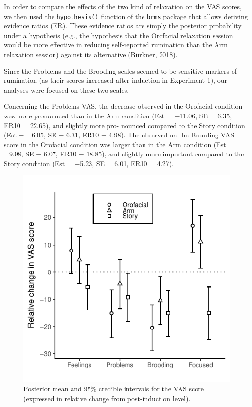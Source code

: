 \documentclass[a4paper,12pt,twoside,openright,oldfontcommands,final]{memoir}
\begin{document}
In order to compare the effects of the two kind of relaxation on the VAS scores, we then used the \texttt{hypothesis()} function of the \texttt{brms} package that allows deriving evidence ratios (ER). These evidence ratios are simply the posterior probability under a hypothesis (e.g., the hypothesis that the Orofacial relaxation session would be more effective in reducing self-reported rumination than the Arm relaxation session) against its alternative (Bürkner, \protect\hyperlink{ref-R-brms}{2018}).

Since the Problems and the Brooding scales seemed to be sensitive markers of rumination (as their scores increased after induction in Experiment 1), our analyses were focused on these two scales.

Concerning the Problems VAS, the decrease observed in the Orofacial condition was more pronounced than in the Arm condition (Est = −11.06, SE = 6.35, ER10 = 22.65), and slightly more pro- nounced compared to the Story condition (Est = −6.05, SE = 6.31, ER10 = 4.98). The observed on the Brooding VAS score in the Orofacial condition was larger than in the Arm condition (Est = −9.98, SE = 6.07, ER10 = 18.85), and slightly more important compared to the Story condition (Est = −5.23, SE = 6.01, ER10 = 4.27).

\begin{figure}[H]

{\centering \includegraphics[width=0.75\linewidth]{assets/emg_fig2} 

}

\caption{Posterior mean and 95\% credible intervals for the VAS score (expressed in relative change from post-induction level).}\label{fig:resultsemgfig2}
\end{figure}
\end{document}
